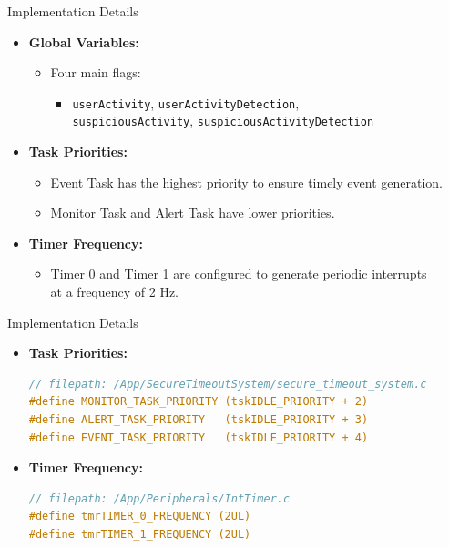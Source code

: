 \begin{frame}{Implementation Details}
    \begin{itemize}
        \item \textbf{Global Variables:}
            \begin{itemize}
                \item Four main flags:
                    \begin{itemize}
                        \item \texttt{userActivity}, \texttt{userActivityDetection}, \\ \texttt{suspiciousActivity}, \texttt{suspiciousActivityDetection}
                    \end{itemize}
            \end{itemize}
        \item \textbf{Task Priorities:}
            \begin{itemize}
                \item Event Task has the highest priority to ensure timely event generation.
                \item Monitor Task and Alert Task have lower priorities.
            \end{itemize}
        \item \textbf{Timer Frequency:}
            \begin{itemize}
                \item Timer 0 and Timer 1 are configured to generate periodic interrupts \\at a frequency of 2 Hz.
            \end{itemize}
    \end{itemize}
\end{frame}

\begin{frame}[fragile]{Implementation Details}
    \begin{itemize}
        \item \textbf{Task Priorities:}
            \begin{lstlisting}[language=C]
// filepath: /App/SecureTimeoutSystem/secure_timeout_system.c
#define MONITOR_TASK_PRIORITY (tskIDLE_PRIORITY + 2)
#define ALERT_TASK_PRIORITY   (tskIDLE_PRIORITY + 3)
#define EVENT_TASK_PRIORITY   (tskIDLE_PRIORITY + 4)
            \end{lstlisting}
        \item \textbf{Timer Frequency:}
            \begin{lstlisting}[language=C]
// filepath: /App/Peripherals/IntTimer.c
#define tmrTIMER_0_FREQUENCY (2UL)
#define tmrTIMER_1_FREQUENCY (2UL)
            \end{lstlisting}
    \end{itemize}
\end{frame}

